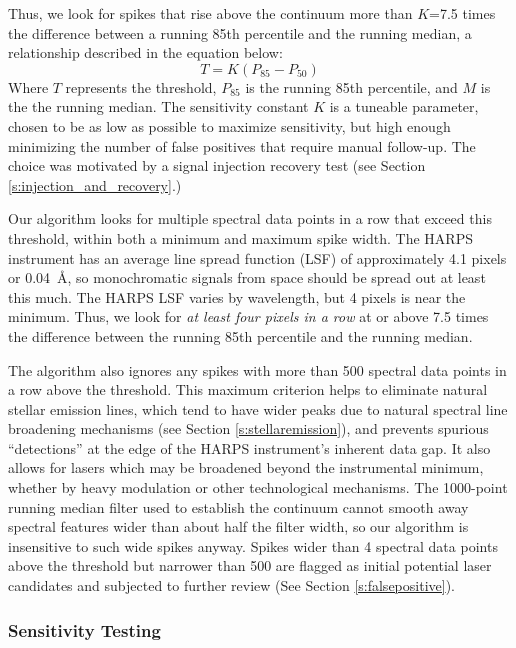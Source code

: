 \documentclass[twocolumn]{aastex701}
\begin{document}
Thus, we look for spikes that rise above the continuum more than $K$=7.5 times the difference between a running 85th percentile and the running median, a relationship  described in the equation below:
\begin{equation}
   T = K (P_{85} -  P_{50})
   \label{eq:threshold}
\end{equation}
Where $T$ represents the threshold, $P_{85}$ is the running 85th percentile, and $M$ is the the running median. The sensitivity constant $K$ is a tuneable parameter, chosen to be as low as possible to maximize sensitivity, but high enough minimizing the number of false positives that require manual follow-up.  The choice was motivated by a signal injection recovery test (see Section \ref{s:injection_and_recovery}.)

Our algorithm looks for multiple spectral data points in a row that exceed this threshold, within both a minimum and maximum spike width. The HARPS instrument has an average line spread function (LSF) of approximately 4.1 pixels \citep{HARPS_specs} or 0.04~\AA, so monochromatic signals from space should be spread out at least this much. The HARPS LSF varies by wavelength, but 4 pixels is near the minimum.  Thus, we look for \emph{at least four pixels in a row} at or above 7.5 times the difference between the running 85th percentile and the running median. 

The algorithm also ignores any spikes with more than 500 spectral data points in a row above the threshold. This maximum criterion helps to eliminate natural stellar emission lines, which tend to have wider peaks due to natural spectral line broadening mechanisms (see Section \ref{s:stellaremission}), and prevents spurious \enquote{detections} at the edge of the HARPS instrument's inherent data gap. It also allows for lasers which may be broadened beyond the instrumental minimum, whether by heavy modulation or other technological mechanisms. The 1000-point running median filter used to establish the continuum cannot smooth away spectral features wider than about half the filter width, so our algorithm is insensitive to such wide spikes anyway.  Spikes wider than 4 spectral data points above the threshold but narrower than 500 are flagged as initial potential laser candidates and subjected to further review (See Section \ref{s:falsepositive}). 

\subsubsection{Sensitivity Testing}
\end{document}
